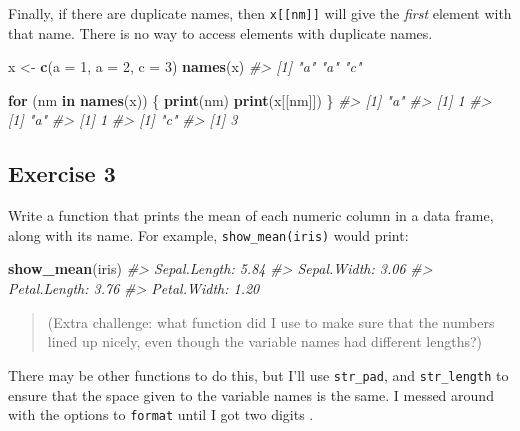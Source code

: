 \documentclass[]{book}
\newenvironment{Shaded}{\begin{snugshade}}{\end{snugshade}}
\newcommand{\CommentTok}[1]{\textcolor[rgb]{0.56,0.35,0.01}{\textit{#1}}}
\newcommand{\ControlFlowTok}[1]{\textcolor[rgb]{0.13,0.29,0.53}{\textbf{#1}}}
\newcommand{\DataTypeTok}[1]{\textcolor[rgb]{0.13,0.29,0.53}{#1}}
\newcommand{\DecValTok}[1]{\textcolor[rgb]{0.00,0.00,0.81}{#1}}
\newcommand{\KeywordTok}[1]{\textcolor[rgb]{0.13,0.29,0.53}{\textbf{#1}}}
\newcommand{\NormalTok}[1]{#1}
\newcommand{\StringTok}[1]{\textcolor[rgb]{0.31,0.60,0.02}{#1}}
\theoremstyle{plain}
\theoremstyle{remark}
\theoremstyle{definition}
\theoremstyle{definition}
\theoremstyle{definition}
\theoremstyle{remark}
\begin{document}
Finally, if there are duplicate names, then \texttt{x{[}{[}nm{]}{]}}
will give the \emph{first} element with that name. There is no way to
access elements with duplicate names.

\begin{Shaded}
\begin{Highlighting}[]
\NormalTok{x <-}\StringTok{ }\KeywordTok{c}\NormalTok{(}\DataTypeTok{a =} \DecValTok{1}\NormalTok{, }\DataTypeTok{a =} \DecValTok{2}\NormalTok{, }\DataTypeTok{c =} \DecValTok{3}\NormalTok{)}
\KeywordTok{names}\NormalTok{(x)}
\CommentTok{#> [1] "a" "a" "c"}
\end{Highlighting}
\end{Shaded}

\begin{Shaded}
\begin{Highlighting}[]
\ControlFlowTok{for}\NormalTok{ (nm }\ControlFlowTok{in} \KeywordTok{names}\NormalTok{(x)) \{}
  \KeywordTok{print}\NormalTok{(nm)}
  \KeywordTok{print}\NormalTok{(x[[nm]])}
\NormalTok{\}}
\CommentTok{#> [1] "a"}
\CommentTok{#> [1] 1}
\CommentTok{#> [1] "a"}
\CommentTok{#> [1] 1}
\CommentTok{#> [1] "c"}
\CommentTok{#> [1] 3}
\end{Highlighting}
\end{Shaded}

\hypertarget{exercise-3-45}{%
\subsection{Exercise 3}\label{exercise-3-45}}

Write a function that prints the mean of each numeric column in a data
frame, along with its name. For example, \texttt{show\_mean(iris)} would
print:

\begin{Shaded}
\begin{Highlighting}[]
\KeywordTok{show_mean}\NormalTok{(iris)}
\CommentTok{#> Sepal.Length: 5.84}
\CommentTok{#> Sepal.Width:  3.06}
\CommentTok{#> Petal.Length: 3.76}
\CommentTok{#> Petal.Width:  1.20}
\end{Highlighting}
\end{Shaded}

\begin{quote}
(Extra challenge: what function did I use to make sure that the numbers
lined up nicely, even though the variable names had different lengths?)
\end{quote}

There may be other functions to do this, but I'll use \texttt{str\_pad},
and \texttt{str\_length} to ensure that the space given to the variable
names is the same. I messed around with the options to \texttt{format}
until I got two digits .
\end{document}
